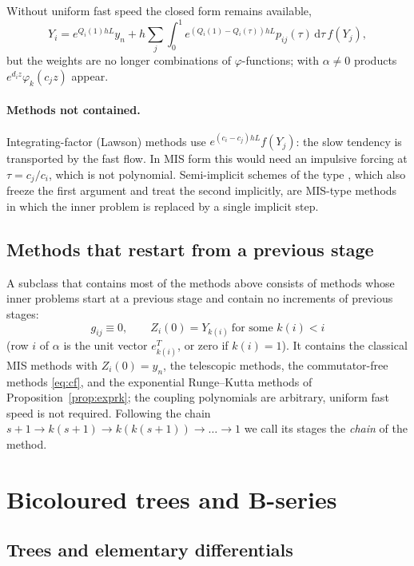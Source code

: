 \documentclass[11pt,a4paper]{article}
\theoremstyle{definition}
\theoremstyle{remark}
\newcommand{\dd}{\,\mathrm{d}}
\begin{document}
Without uniform fast speed the closed form remains available,
\[
 Y_i=e^{Q_i(1)hL}y_n+h\sum_j\int_0^1e^{(Q_i(1)-Q_i(\tau))hL}p_{ij}(\tau)\dd\tau\,f(Y_j),
\]
but the weights are no longer
combinations of $\varphi$-functions; with $\alpha\ne0$ products $e^{d_iz}\varphi_k(c_jz)$ appear.

\paragraph{Methods not contained.}
Integrating-factor (Lawson) methods \cite{Lawson1967} use $e^{(c_i-c_j)hL}f(Y_j)$: the slow tendency is transported
by the fast flow. In MIS form this would need an impulsive forcing at $\tau=c_j/c_i$, which is not polynomial.
Semi-implicit schemes of the type \cite{BoscarinoFilbetRusso2016}, which also freeze the first argument and treat the
second implicitly, are MIS-type methods in which the inner problem is replaced by a single implicit step.

\subsection{Methods that restart from a previous stage}

A subclass that contains most of the methods above consists of methods whose inner problems start at a previous stage
and contain no increments of previous stages:
\begin{equation}\label{eq:restart}
 g_{ij}\equiv0,\qquad Z_i(0)=Y_{k(i)}\ \text{for some }k(i)<i
\end{equation}
(row $i$ of $\alpha$ is the unit vector $e_{k(i)}^T$, or zero if $k(i)=1$). It contains the classical MIS methods with
$Z_i(0)=y_n$, the telescopic methods, the commutator-free methods \eqref{eq:cf}, and the exponential Runge--Kutta methods of Proposition~\ref{prop:exprk}; the
coupling polynomials are arbitrary, uniform fast speed is not required. Following the chain
$s+1\to k(s+1)\to k(k(s+1))\to\dots\to1$ we call its stages the \emph{chain} of the method.

\section{Bicoloured trees and B-series}
\label{sec:trees}

\subsection{Trees and elementary differentials}
\end{document}
